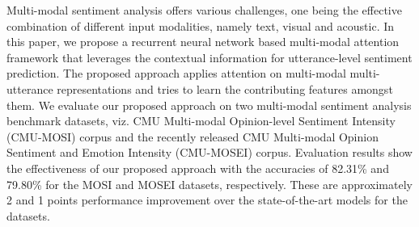 Multi-modal sentiment analysis offers various challenges, one being the effective combination of different input modalities, namely text, visual and acoustic. In this paper, we propose a recurrent neural network based multi-modal attention framework that leverages the contextual information for utterance-level sentiment prediction. The proposed approach applies attention on multi-modal multi-utterance representations and tries to learn the contributing features amongst them. We evaluate our proposed approach on two multi-modal sentiment analysis benchmark datasets, viz.  CMU Multi-modal Opinion-level Sentiment Intensity (CMU-MOSI) corpus and the recently released CMU Multi-modal Opinion Sentiment and Emotion Intensity (CMU-MOSEI) corpus. Evaluation results show the effectiveness of our proposed approach with the accuracies of 82.31\% and 79.80\% for the MOSI and MOSEI datasets, respectively. These are approximately 2 and 1 points performance improvement over the state-of-the-art models for the datasets.
